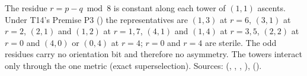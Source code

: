 The residue $r = p - q \bmod 8$ is constant along each tower of $(1,1)$ ascents. Under T14's Premise P3 () the representatives are $(1,3)$ at $r = 6$, $(3,1)$ at $r = 2$, $(2,1)$ and $(1,2)$ at $r = 1, 7$, $(4,1)$ and $(1,4)$ at $r = 3, 5$, $(2,2)$ at $r = 0$ and $(4,0)$ or $(0,4)$ at $r = 4$; $r = 0$ and $r = 4$ are sterile. The odd residues carry no orientation bit and therefore no asymmetry. The towers interact only through the one metric (exact superselection). Sources: \cite[Prop.~3.1, Thm.~3.4, Thm.~3.10, Prop.~4.1]{ButlerT14} (, , , ), \cite[Thm.~3.6]{ButlerT3} ().
